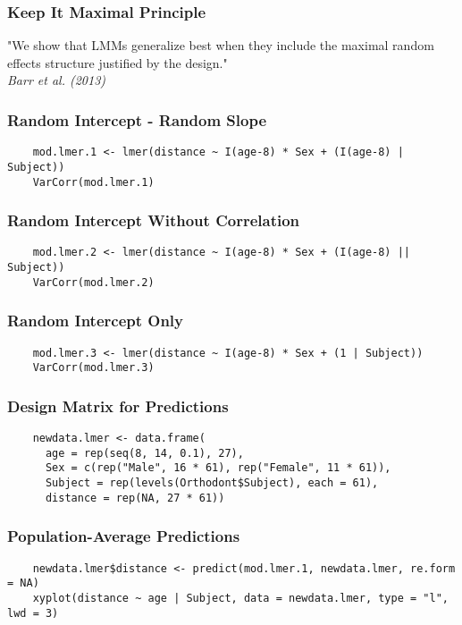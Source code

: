 \documentclass{beamer}
\begin{document}
\begin{frame}
    \frametitle{Keep It Maximal Principle}
    \small{
    "We show that LMMs generalize best when they include the maximal random effects structure justified by the design." \\
    \textit{Barr et al. (2013)}
    }
\end{frame}

\begin{frame}[fragile]
    \frametitle{Random Intercept - Random Slope}
    \lstset{style=Rstyle}
    \begin{lstlisting}
    mod.lmer.1 <- lmer(distance ~ I(age-8) * Sex + (I(age-8) | Subject))
    VarCorr(mod.lmer.1)
    \end{lstlisting}
\end{frame}

\begin{frame}[fragile]
    \frametitle{Random Intercept Without Correlation}
    \lstset{style=Rstyle}
    \begin{lstlisting}
    mod.lmer.2 <- lmer(distance ~ I(age-8) * Sex + (I(age-8) || Subject))
    VarCorr(mod.lmer.2)
    \end{lstlisting}
\end{frame}

\begin{frame}[fragile]
    \frametitle{Random Intercept Only}
    \lstset{style=Rstyle}
    \begin{lstlisting}
    mod.lmer.3 <- lmer(distance ~ I(age-8) * Sex + (1 | Subject))
    VarCorr(mod.lmer.3)
    \end{lstlisting}
\end{frame}

\begin{frame}[fragile]
    \frametitle{Design Matrix for Predictions}
    \lstset{style=Rstyle}
    \begin{lstlisting}
    newdata.lmer <- data.frame(
      age = rep(seq(8, 14, 0.1), 27),
      Sex = c(rep("Male", 16 * 61), rep("Female", 11 * 61)),
      Subject = rep(levels(Orthodont$Subject), each = 61),
      distance = rep(NA, 27 * 61))
    \end{lstlisting}
\end{frame}

\begin{frame}[fragile]
    \frametitle{Population-Average Predictions}
    \lstset{style=Rstyle}
    \begin{lstlisting}
    newdata.lmer$distance <- predict(mod.lmer.1, newdata.lmer, re.form = NA)
    xyplot(distance ~ age | Subject, data = newdata.lmer, type = "l", lwd = 3)
    \end{lstlisting}
\end{frame}
\end{document}
